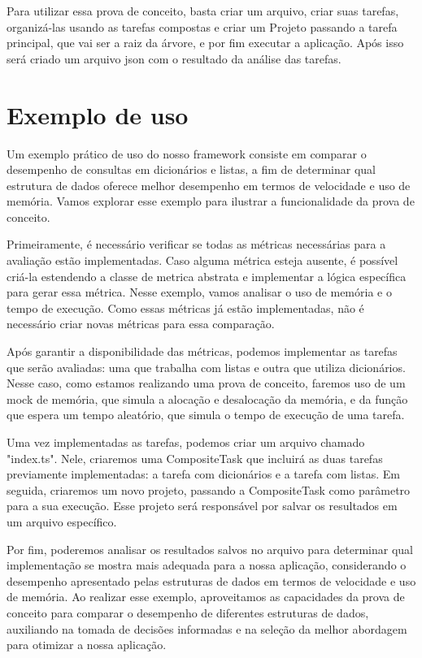 \documentclass[12pt]{tcc}
\begin{document}
Para utilizar essa prova de conceito, basta criar um arquivo, criar suas tarefas, organizá-las usando as tarefas compostas e criar um Projeto passando a tarefa principal, que vai ser a raiz da árvore, e por fim executar a aplicação. Após isso será criado um arquivo json com o resultado da análise das tarefas.

\section{Exemplo de uso}
Um exemplo prático de uso do nosso framework consiste em comparar o desempenho de consultas em dicionários e listas, a fim de determinar qual estrutura de dados oferece melhor desempenho em termos de velocidade e uso de memória. Vamos explorar esse exemplo para ilustrar a funcionalidade da prova de conceito.

Primeiramente, é necessário verificar se todas as métricas necessárias para a avaliação estão implementadas. Caso alguma métrica esteja ausente, é possível criá-la estendendo a classe de metrica abstrata e implementar a lógica específica para gerar essa métrica. Nesse exemplo, vamos analisar o uso de memória e o tempo de execução. Como essas métricas já estão implementadas, não é necessário criar novas métricas para essa comparação.

Após garantir a disponibilidade das métricas, podemos implementar as tarefas que serão avaliadas: uma que trabalha com listas e outra que utiliza dicionários. Nesse caso, como estamos realizando uma prova de conceito, faremos uso de um mock de memória, que simula a alocação e desalocação da memória, e da função que espera um tempo aleatório, que simula o tempo de execução de uma tarefa.

Uma vez implementadas as tarefas, podemos criar um arquivo chamado "index.ts". Nele, criaremos uma CompositeTask que incluirá as duas tarefas previamente implementadas: a tarefa com dicionários e a tarefa com listas. Em seguida, criaremos um novo projeto, passando a CompositeTask como parâmetro para a sua execução. Esse projeto será responsável por salvar os resultados em um arquivo específico.

Por fim, poderemos analisar os resultados salvos no arquivo para determinar qual implementação se mostra mais adequada para a nossa aplicação, considerando o desempenho apresentado pelas estruturas de dados em termos de velocidade e uso de memória. Ao realizar esse exemplo, aproveitamos as capacidades da prova de conceito para comparar o desempenho de diferentes estruturas de dados, auxiliando na tomada de decisões informadas e na seleção da melhor abordagem para otimizar a nossa aplicação.
\end{document}
